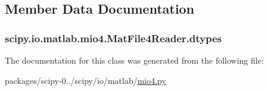 \subsection{Member Data Documentation}
\hypertarget{classscipy_1_1io_1_1matlab_1_1mio4_1_1MatFile4Reader_a2c35476fccb4d41e1c80ec60aef4a372}{}
\subsubsection[{dtypes}]{\setlength{\rightskip}{0pt plus 5cm}scipy.\+io.\+matlab.\+mio4.\+Mat\+File4\+Reader.\+dtypes}\label{classscipy_1_1io_1_1matlab_1_1mio4_1_1MatFile4Reader_a2c35476fccb4d41e1c80ec60aef4a372}


The documentation for this class was generated from the following file\+:\begin{DoxyCompactItemize}
\item 
packages/scipy-\/0../scipy/io/matlab/\hyperlink{mio4_8py}{mio4.\+py}\end{DoxyCompactItemize}
